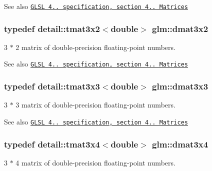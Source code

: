\begin{DoxySeeAlso}{\-See also}
\href{http://www.opengl.org/registry/doc/GLSLangSpec.4.20.8.pdf}{\tt \-G\-L\-S\-L 4.. specification, section 4.. \-Matrices} 
\end{DoxySeeAlso}
\hypertarget{group__core__types_ga44d603bc9ed3688928f508fb161c71f0}{
\subsubsection[{dmat3x2}]{\setlength{\rightskip}{0pt plus 5cm}typedef detail\-::tmat3x2$<$double$>$ {\bf glm\-::dmat3x2}}}\label{group__core__types_ga44d603bc9ed3688928f508fb161c71f0}
3 $\ast$ 2 matrix of double-\/precision floating-\/point numbers.

\begin{DoxySeeAlso}{\-See also}
\href{http://www.opengl.org/registry/doc/GLSLangSpec.4.20.8.pdf}{\tt \-G\-L\-S\-L 4.. specification, section 4.. \-Matrices} 
\end{DoxySeeAlso}
\hypertarget{group__core__types_ga415251df22cffb39bc14078ff057a6c3}{
\subsubsection[{dmat3x3}]{\setlength{\rightskip}{0pt plus 5cm}typedef detail\-::tmat3x3$<$double$>$ {\bf glm\-::dmat3x3}}}\label{group__core__types_ga415251df22cffb39bc14078ff057a6c3}
3 $\ast$ 3 matrix of double-\/precision floating-\/point numbers.

\begin{DoxySeeAlso}{\-See also}
\href{http://www.opengl.org/registry/doc/GLSLangSpec.4.20.8.pdf}{\tt \-G\-L\-S\-L 4.. specification, section 4.. \-Matrices} 
\end{DoxySeeAlso}
\hypertarget{group__core__types_ga9ec18b898499ad524dc93f2d4d78b877}{
\subsubsection[{dmat3x4}]{\setlength{\rightskip}{0pt plus 5cm}typedef detail\-::tmat3x4$<$double$>$ {\bf glm\-::dmat3x4}}}\label{group__core__types_ga9ec18b898499ad524dc93f2d4d78b877}
3 $\ast$ 4 matrix of double-\/precision floating-\/point numbers.

